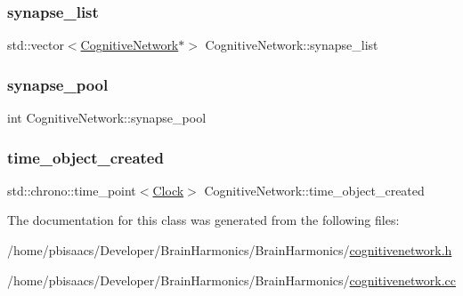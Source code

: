 \subsubsection{\texorpdfstring{synapse\+\_\+list}{synapse\_list}}
{\footnotesize\ttfamily std\+::vector$<$\mbox{\hyperlink{classCognitiveNetwork}{Cognitive\+Network}}$\ast$$>$ Cognitive\+Network\+::synapse\+\_\+list\hspace{0.3cm}{\ttfamily [protected]}}

\mbox{\label{classCognitiveNetwork_acce7f5451dd50c27689d2239fbd66394}} 
\subsubsection{\texorpdfstring{synapse\+\_\+pool}{synapse\_pool}}
{\footnotesize\ttfamily int Cognitive\+Network\+::synapse\+\_\+pool\hspace{0.3cm}{\ttfamily [private]}}

\mbox{\label{classCognitiveNetwork_a00751b9bc40bf22efd7a86a58478c760}} 
\subsubsection{\texorpdfstring{time\+\_\+object\+\_\+created}{time\_object\_created}}
{\footnotesize\ttfamily std\+::chrono\+::time\+\_\+point$<$\mbox{\hyperlink{universe_8h_a0ef8d951d1ca5ab3cfaf7ab4c7a6fd80}{Clock}}$>$ Cognitive\+Network\+::time\+\_\+object\+\_\+created\hspace{0.3cm}{\ttfamily [private]}}



The documentation for this class was generated from the following files\+:\begin{DoxyCompactItemize}
\item 
/home/pbisaacs/\+Developer/\+Brain\+Harmonics/\+Brain\+Harmonics/\mbox{\hyperlink{cognitivenetwork_8h}{cognitivenetwork.\+h}}\item 
/home/pbisaacs/\+Developer/\+Brain\+Harmonics/\+Brain\+Harmonics/\mbox{\hyperlink{cognitivenetwork_8cc}{cognitivenetwork.\+cc}}\end{DoxyCompactItemize}

